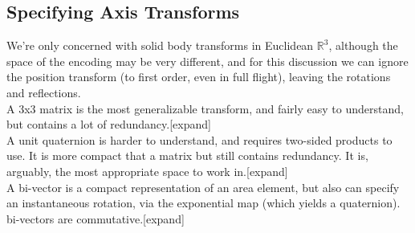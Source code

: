 \documentclass{article}
\begin{document}
\subsection{Specifying Axis Transforms}
We're only concerned with solid body transforms in Euclidean
$\mathbb{R}^3$, although the space of the encoding may be very
different, and for this discussion we can ignore the position
transform (to first order, even in full flight), leaving the rotations
and reflections.
\\
A 3x3 matrix is the most generalizable transform, and fairly easy
to understand, but contains a lot of redundancy.[expand]
\\
A unit quaternion is harder to understand, and requires two-sided
products to use. It is more compact that a matrix but still contains
redundancy. It is, arguably, the most appropriate space to work
in.[expand]
\\
A bi-vector is a compact representation of an area element, but also
can specify an instantaneous rotation, via the exponential map (which
yields a quaternion). bi-vectors are commutative.[expand]
\\
\end{document}
